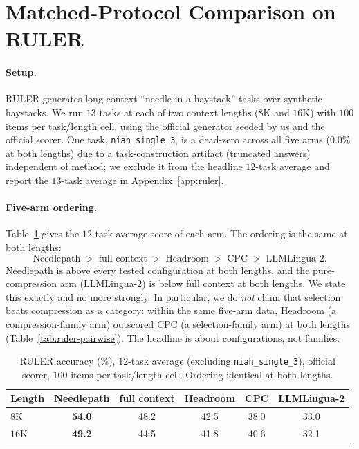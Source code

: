 \documentclass[11pt]{article}
\newcommand{\NP}{Needlepath}
\begin{document}
\section{Matched-Protocol Comparison on RULER}
\label{sec:ruler}

\paragraph{Setup.} RULER \citep{hsieh2024ruler} generates long-context ``needle-in-a-haystack''
tasks over synthetic haystacks. We run $13$ tasks at each of two context lengths ($8$K and $16$K)
with $100$ items per task/length cell, using the official generator seeded by us and the official
scorer. One task, \texttt{niah\_single\_3}, is a dead-zero across all five arms ($0.0\%$ at both
lengths) due to a task-construction artifact (truncated answers) independent of method; we
exclude it from the headline $12$-task average and report the $13$-task average in
Appendix~\ref{app:ruler}.

\paragraph{Five-arm ordering.} Table~\ref{tab:ruler-scores} gives the $12$-task average score of
each arm. The ordering is the same at both lengths:
\[
\text{\NP{}} \;>\; \text{full context} \;>\; \text{Headroom} \;>\; \text{CPC} \;>\; \text{LLMLingua-2}.
\]
\NP{} is above every tested configuration at both lengths, and the pure-compression arm
(LLMLingua-2) is below full context at both lengths. We state this exactly and no more strongly.
In particular, we do \emph{not} claim that selection beats compression as a category: within the
same five-arm data, Headroom (a compression-family arm) outscored CPC (a selection-family arm) at
both lengths (Table~\ref{tab:ruler-pairwise}). The headline is about configurations, not families.

\begin{table}[t]
\centering
\small
\begin{tabular}{@{}lccccc@{}}
\toprule
Length & \NP{} & full context & Headroom & CPC & LLMLingua-2 \\
\midrule
$8$K  & \textbf{54.0} & 48.2 & 42.5 & 38.0 & 33.0 \\
$16$K & \textbf{49.2} & 44.5 & 41.8 & 40.6 & 32.1 \\
\bottomrule
\end{tabular}
\caption{RULER accuracy (\%), $12$-task average (excluding \texttt{niah\_single\_3}), official
scorer, $100$ items per task/length cell. Ordering identical at both lengths.}
\label{tab:ruler-scores}
\end{table}
\end{document}
